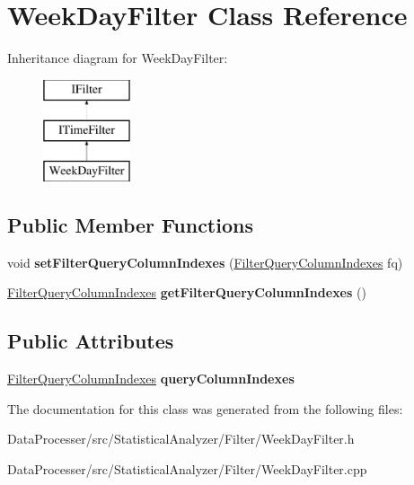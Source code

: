 \hypertarget{classWeekDayFilter}{}\section{Week\+Day\+Filter Class Reference}
\label{classWeekDayFilter}
Inheritance diagram for Week\+Day\+Filter\+:\begin{figure}[H]
\begin{center}
\leavevmode
\includegraphics[height=3.000000cm]{classWeekDayFilter}
\end{center}
\end{figure}
\subsection*{Public Member Functions}
\begin{DoxyCompactItemize}
\item 
\mbox{\label{classWeekDayFilter_ab0d84d7054d8b84c1d80a8658a5453ff}} 
void {\bfseries set\+Filter\+Query\+Column\+Indexes} (\hyperlink{structFilterQueryColumnIndexes}{Filter\+Query\+Column\+Indexes} fq)
\item 
\mbox{\label{classWeekDayFilter_a5651f921e2beea0477826404372d8127}} 
\hyperlink{structFilterQueryColumnIndexes}{Filter\+Query\+Column\+Indexes} {\bfseries get\+Filter\+Query\+Column\+Indexes} ()
\end{DoxyCompactItemize}
\subsection*{Public Attributes}
\begin{DoxyCompactItemize}
\item 
\mbox{\label{classWeekDayFilter_a770624363217b22f20fa78d2dacf43e4}} 
\hyperlink{structFilterQueryColumnIndexes}{Filter\+Query\+Column\+Indexes} {\bfseries query\+Column\+Indexes}
\end{DoxyCompactItemize}


The documentation for this class was generated from the following files\+:\begin{DoxyCompactItemize}
\item 
Data\+Processer/src/\+Statistical\+Analyzer/\+Filter/Week\+Day\+Filter.\+h\item 
Data\+Processer/src/\+Statistical\+Analyzer/\+Filter/Week\+Day\+Filter.\+cpp\end{DoxyCompactItemize}
